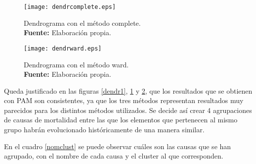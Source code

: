 \documentclass{article}
\begin{document}
\begin{figure}[H]
\centering
\texttt{[image: dendrcomplete.eps]}
\caption{\centering Dendrograma con el método complete. \\ \textbf{Fuente:} Elaboración propia.}
\label{dendr2}
\end{figure}

\begin{figure}[H]
\centering
\texttt{[image: dendrward.eps]}
\caption{\centering Dendrograma con el método ward. \\ \textbf{Fuente:} Elaboración propia.}
\label{dendr3}
\end{figure}


Queda justificado en las figuras \ref{dendr1}, \ref{dendr2} y \ref{dendr3},  que los resultados que se obtienen con PAM son consistentes, ya que los tres métodos representan resultados muy parecidos para los distintos métodos utilizados. Se decide así crear 4 agrupaciones de causas de mortalidad entre las que los elementos que pertenecen al mismo grupo habrán evolucionado históricamente de una manera similar.

\vspace{0.3cm}

En el cuadro \ref{nomclust} se puede observar cuáles son las causas que se han agrupado, con el nombre de cada causa y el cluster al que corresponden.
\end{document}
